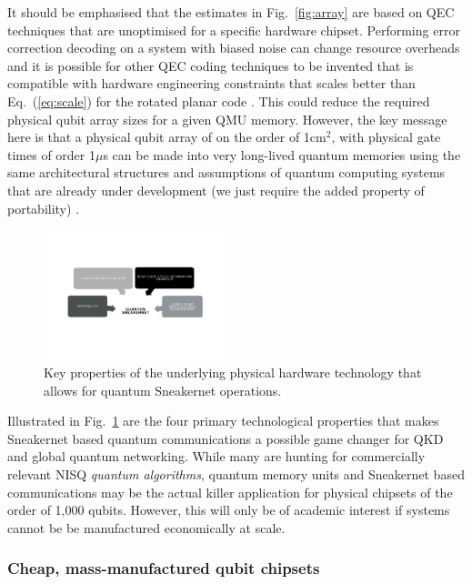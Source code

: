 \documentclass[twocolumn, aps, rmp, amsmath, amssymb, nofootinbib, superscriptaddress, longbibliography, floatfix, table-of-contents, eqsecnum]{revtex4-2}
\begin{document}
It should be emphasised that the estimates in Fig.~\ref{fig:array} are based on QEC techniques that are unoptimised for a specific hardware chipset. Performing error correction decoding on a system with biased noise \cite{SD-Tuckett:2018aa} can change resource overheads and it is possible for other QEC coding techniques to be invented that is compatible with hardware engineering constraints that scales better than Eq.~(\ref{eq:scale}) for the rotated planar code \cite{SD-Bombin:2015aa,SD-Breuckmann:2017aa,SD-Fawzi:2018aa}. This could reduce the required physical qubit array sizes for a given QMU memory. However, the key message here is that a physical qubit array of on the order of 1cm$^2$, with physical gate times of order 1$\mu$s can be made into very long-lived quantum memories using the same architectural structures and assumptions of quantum computing systems that are already under development (we just require the added property of portability) \cite{SD-Jones:2012aa,SD-Gimeno-Segovia:2015aa,SD-Nemoto:2014aa,SD-Hill:2015aa,SD-Lekitsch:2017aa}. 

\begin{figure}[htbp!]
	\includegraphics[clip=true, width=0.475\textwidth]{goal}
	\caption{Key properties of the underlying physical hardware technology that allows for quantum Sneakernet operations.} \label{fig:goal}
\end{figure}

Illustrated in Fig.~\ref{fig:goal} are the four primary technological properties that makes Sneakernet based quantum communications a possible game changer for QKD and global quantum networking. While many are hunting for commercially relevant NISQ \textit{quantum algorithms}, quantum memory units and Sneakernet based communications may be the actual killer application for physical chipsets of the order of 1,000 qubits. However, this will only be of academic interest if systems cannot be be manufactured economically at scale.

\subsubsection{Cheap, mass-manufactured qubit chipsets}
\end{document}
